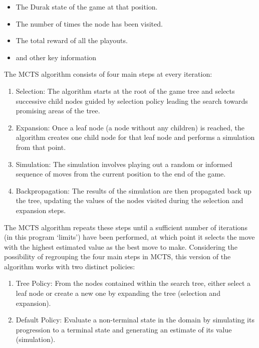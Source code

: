 \begin{itemize}
	\item The Durak state of the game at that position.
	\item The number of times the node has been visited.
	\item The total reward of all the playouts.
	\item and other key information
\end{itemize}

The MCTS algorithm consists of four main steps at every iteration:

\begin{enumerate}
	\item Selection: The algorithm starts at the root of the game tree and selects successive child nodes guided by selection policy leading the search towards promising areas of the tree.
	
	\item Expansion: Once a leaf node (a node without any children) is reached, the algorithm creates one child node for that leaf node and performs a simulation from that point.
	
	\item Simulation: The simulation involves playing out a random or informed sequence of moves from the current position to the end of the game.
	
	\item Backpropagation: The results of the simulation are then propagated back up the tree, updating the values of the nodes visited during the selection and expansion steps.
	
\end{enumerate}

The MCTS algorithm repeats these steps until a sufficient number of iterations (in this program `limits') have been performed, at which point it selects the move with the highest estimated value as the best move to make. Considering the possibility of regrouping the four main steps in MCTS, this version of the algorithm works with two distinct policies: 

\begin{enumerate}
	\item Tree Policy: From the nodes contained within the search tree, either select a leaf node or create a new one by expanding the tree (selection and expansion).
	
	\item Default Policy: Evaluate a non-terminal state in the domain by simulating its progression to a terminal state and generating an estimate of its value (simulation).
\end{enumerate}

